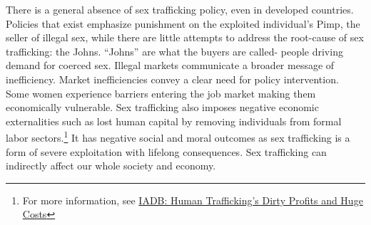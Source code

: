 \documentclass[12pt]{article}
\begin{document}
\indent There is a general absence of sex trafficking policy, even in developed countries. Policies that exist emphasize punishment on the exploited individual’s Pimp, the seller of illegal sex, while there are little attempts to address the root-cause of sex trafficking: the Johns. “Johns” are what the buyers are called- people driving demand for coerced sex. Illegal markets communicate a broader message of inefficiency. Market inefficiencies convey a clear need for policy intervention. Some women experience barriers entering the job market making them economically vulnerable. Sex trafficking also imposes negative economic externalities such as lost human capital by removing individuals from formal labor sectors.\footnote{For more information, see \href{https://www.iadb.org/en/news/human-traffickings-dirty-profits-and-huge-costs}{IADB: Human Trafficking's Dirty Profits and Huge Costs}} It has negative social and moral outcomes as sex trafficking is a form of severe exploitation with lifelong consequences. Sex trafficking can indirectly affect our whole society and economy. \\
\end{document}
